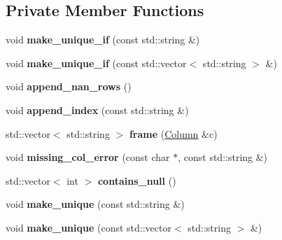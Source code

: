 \subsection*{Private Member Functions}
\begin{DoxyCompactItemize}
\item 
\mbox{\label{classDataFrame_a8454f81fa6854f280c48672214224160}} 
void {\bfseries make\+\_\+unique\+\_\+if} (const std\+::string \&)
\item 
\mbox{\label{classDataFrame_a2bb66e58b8b8153d4ae7c5e640f0fab4}} 
void {\bfseries make\+\_\+unique\+\_\+if} (const std\+::vector$<$ std\+::string $>$ \&)
\item 
\mbox{\label{classDataFrame_a8f22d43916f61216b13a36843941d1a6}} 
void {\bfseries append\+\_\+nan\+\_\+rows} ()
\item 
\mbox{\label{classDataFrame_afd67ba56aa6bbe5f0c8112953a83cf83}} 
void {\bfseries append\+\_\+index} (const std\+::string \&)
\item 
\mbox{\label{classDataFrame_aebbbb689141a2ad10a3f4d5c671a3af6}} 
std\+::vector$<$ std\+::string $>$ {\bfseries frame} (\hyperlink{classColumn}{Column} \&c)
\item 
\mbox{\label{classDataFrame_af8b8dbf9680e79fca9731dbba671ad94}} 
void {\bfseries missing\+\_\+col\+\_\+error} (const char $\ast$, const std\+::string \&)
\item 
\mbox{\label{classDataFrame_a0c07e473d7fcb446ae4b4313d24b6076}} 
std\+::vector$<$ int $>$ {\bfseries contains\+\_\+null} ()
\item 
\mbox{\label{classDataFrame_ae4262bac09b53ff891461cb9b8a26bc1}} 
void {\bfseries make\+\_\+unique} (const std\+::string \&)
\item 
\mbox{\label{classDataFrame_a428feca8859bed363d7c9b774f997551}} 
void {\bfseries make\+\_\+unique} (const std\+::vector$<$ std\+::string $>$ \&)
\item 
\mbox{\label{classDataFrame_a914f2625f0d8f09c79d45832d12a2be1}} 

\end{DoxyCompactItemize}
